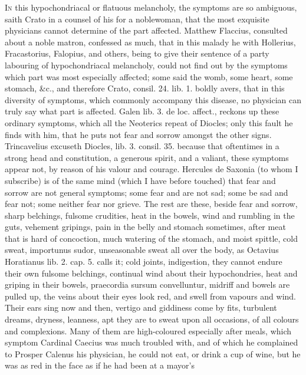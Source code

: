 {\lettrine{I}{n} this hypochondriacal or flatuous melancholy, the symptoms are so
ambiguous, saith Crato in a counsel of his for a noblewoman, that
the most exquisite physicians cannot determine of the part affected.
Matthew Flaccius, consulted about a noble matron, confessed as much,
that in this malady he with Hollerius, Fracastorius, Falopius, and
others, being to give their sentence of a party labouring of
hypochondriacal melancholy, could not find out by the symptoms which
part was most especially affected; some said the womb, some heart, some
stomach, \&c., and therefore Crato, consil. 24. lib. 1. boldly avers,
that in this diversity of symptoms, which commonly accompany this
disease, no physician can truly say what part is affected. Galen
lib. 3. de loc. affect., reckons up these ordinary symptoms, which all
the Neoterics repeat of Diocles; only this fault he finds with him,
that he puts not fear and sorrow amongst the other signs. Trincavelius
excuseth Diocles, lib. 3. consil. 35. because that oftentimes in a
strong head and constitution, a generous spirit, and a valiant, these
symptoms appear not, by reason of his valour and courage.
Hercules de Saxonia (to whom I subscribe) is of the same mind
(which I have before touched) that fear and sorrow are not general
symptoms; some fear and are not sad; some be sad and fear not; some
neither fear nor grieve. The rest are these, beside fear and sorrow,
sharp belchings, fulsome crudities, heat in the bowels, wind and
rumbling in the guts, vehement gripings, pain in the belly and stomach
sometimes, after meat that is hard of concoction, much watering of the
stomach, and moist spittle, cold sweat, importunus sudor, unseasonable
sweat all over the body, as Octavius Horatianus lib. 2. cap. 5. calls
it; cold joints, indigestion, they cannot endure their own
fulsome belchings, continual wind about their hypochondries, heat and
griping in their bowels, praecordia sursum convelluntur, midriff and
bowels are pulled up, the veins about their eyes look red, and swell
from vapours and wind. Their ears sing now and then, vertigo and
giddiness come by fits, turbulent dreams, dryness, leanness, apt they
are to sweat upon all occasions, of all colours and complexions. Many
of them are high-coloured especially after meals, which symptom
Cardinal Caecius was much troubled with, and of which he complained to
Prosper Calenus his physician, he could not eat, or drink a cup of
wine, but he was as red in the face as if he had been at a mayor's
}

